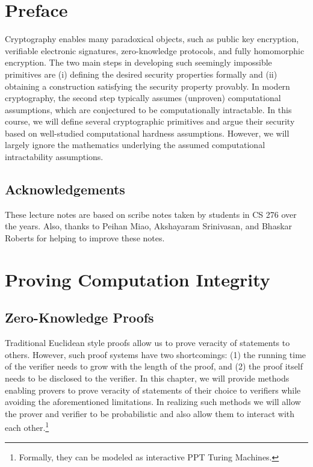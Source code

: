 \documentclass[12pt]{tufte-book}
\begin{document}
\cleardoublepage
\fi
\chapter*{Preface}
Cryptography enables many paradoxical objects, such as public key encryption, verifiable electronic signatures, zero-knowledge protocols, and fully homomorphic encryption.  The two main steps in developing such seemingly impossible primitives are (i) defining the desired security properties formally and (ii) obtaining a construction satisfying the security property provably. In modern cryptography, the second step typically assumes (unproven) computational assumptions, which are conjectured to be computationally intractable. In this course, we will define several cryptographic primitives and argue their security based on well-studied computational hardness assumptions. However, we will largely ignore the mathematics underlying the assumed computational intractability assumptions.

\section*{Acknowledgements}
These lecture notes are based on scribe notes taken by students in CS 276 over the years. Also, thanks to Peihan Miao, Akshayaram Srinivasan, and Bhaskar Roberts for helping to improve these notes.
\newcommand{\sanjam}[1]{{\color{red} Sanjam: #1}}

\newcommand{\bhaskar}[1]{{\color{ForestGreen} Bhaskar: #1}}

\mainmatter
%
%
%
%
%
%
%
%
%
%
%
%
%
%
%
%
%
%
\chapter{Proving Computation Integrity}
\section{Zero-Knowledge Proofs}
Traditional Euclidean style proofs allow us to prove veracity of statements to others. However, such proof systems have two shortcomings: (1) the running time of the verifier needs to grow with the length of the proof, and (2) the proof itself needs to be disclosed to the verifier. In this chapter, we will provide methods enabling provers to prove veracity of statements of their choice to verifiers while avoiding the aforementioned limitations. In realizing such methods we will allow the prover and verifier to be probabilistic and also allow them to interact with each other.\footnote{Formally, they can be modeled as interactive PPT Turing Machines.}
\end{document}

